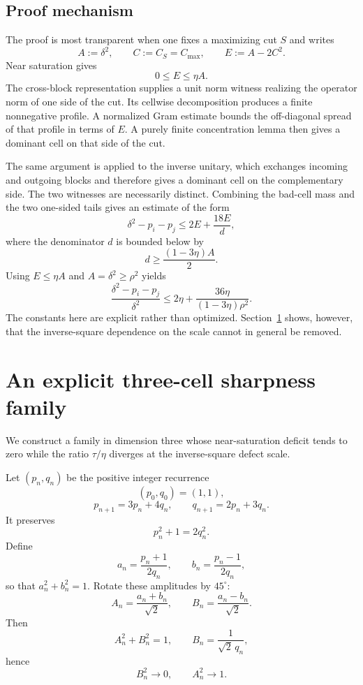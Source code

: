 \documentclass[11pt]{article}
\newcommand{\cmax}{C_{\max}}
\newcommand{\dd}{\delta}
\newcommand{\etaq}{\eta}
\newcommand{\tauq}{\tau}
\begin{document}
\subsection{Proof mechanism}

The proof is most transparent when one fixes a maximizing cut $S$ and writes
\[
  A:=\dd^2,\qquad
  C:=C_S=\cmax,\qquad
  E:=A-2C^2.
\]
Near saturation gives
\[
  0\le E\le\etaq A.
\]
The cross-block representation supplies a unit norm witness realizing the
operator norm of one side of the cut.  Its cellwise decomposition produces a
finite nonnegative profile.  A normalized Gram estimate bounds the
off-diagonal spread of that profile in terms of $E$.  A purely finite
concentration lemma then gives a dominant cell on that side of the cut.

The same argument is applied to the inverse unitary, which exchanges incoming
and outgoing blocks and therefore gives a dominant cell on the complementary
side.  The two witnesses are necessarily distinct.  Combining the bad-cell
mass and the two one-sided tails gives an estimate of the form
\[
  \dd^2-p_i-p_j
  \le
  2E+\frac{18E}{d},
\]
where the denominator $d$ is bounded below by
\[
  d\ge\frac{(1-3\etaq)A}{2}.
\]
Using $E\le\etaq A$ and $A=\dd^2\ge\rho^2$ yields
\[
  \frac{\dd^2-p_i-p_j}{\dd^2}
  \le
  2\etaq+
  \frac{36\etaq}{(1-3\etaq)\rho^2}.
\]
The constants here are explicit rather than optimized.  Section~\ref{sec:sharp}
shows, however, that the inverse-square dependence on the scale cannot in
general be removed.

\section{An explicit three-cell sharpness family}\label{sec:sharp}

We construct a family in dimension three whose near-saturation deficit tends
to zero while the ratio $\tauq/\etaq$ diverges at the inverse-square defect
scale.

Let $(p_n,q_n)$ be the positive integer recurrence
\[
  (p_0,q_0)=(1,1),
\]
\[
  p_{n+1}=3p_n+4q_n,
  \qquad
  q_{n+1}=2p_n+3q_n.
\]
It preserves
\begin{equation}\label{eq:pell}
  p_n^2+1=2q_n^2.
\end{equation}
Define
\[
  a_n=\frac{p_n+1}{2q_n},
  \qquad
  b_n=\frac{p_n-1}{2q_n},
\]
so that $a_n^2+b_n^2=1$.  Rotate these amplitudes by $45^\circ$:
\begin{equation}\label{eq:AB}
  A_n=\frac{a_n+b_n}{\sqrt2},
  \qquad
  B_n=\frac{a_n-b_n}{\sqrt2}.
\end{equation}
Then
\[
  A_n^2+B_n^2=1,\qquad
  B_n=\frac{1}{\sqrt2\,q_n},
\]
hence
\begin{equation}\label{eq:AB-limits}
  B_n^2\to0,\qquad A_n^2\to1.
\end{equation}
\end{document}
